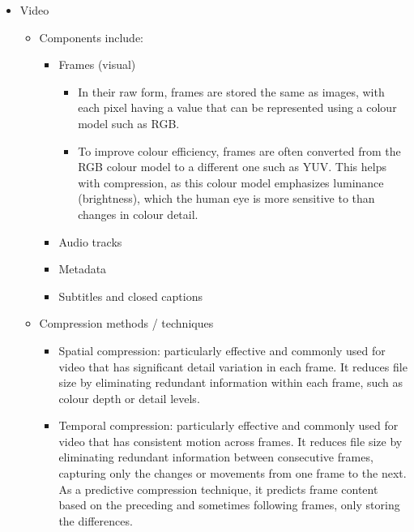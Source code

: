 \documentclass[a4paper,12pt]{article}
\begin{document}
\begin{itemize}
\begin{enumerate}
		\item Formula for calculating audio size:
		\[\text{file size (bits)}=\text{sampling rate}\times \text{bit depth}\times\text{\# of channels}\]
		\item Many formats to choose from for storing audio files: (They mainly differ by whether they are compressed or uncompressed)
		\begin{itemize}
		    \item Uncompressed formats store the raw binary data (e.g. WAV, AIFF)
		    \item Compressed formats use algorithms to reduce the file size for storage or transmission (e.g. MP3, FLAC)
		    \end{itemize}
        \end{enumerate}
    \item Video
    \begin{itemize}
        \item Components include:
        \begin{itemize}
            \item Frames (visual)
            \begin{itemize}
                \item In their raw form, frames are stored the same as images, with each pixel having a value that can be represented using a colour model such as RGB.
                \item To improve colour efficiency, frames are often converted from the RGB colour model to a different one such as YUV. This helps with compression, as this colour model emphasizes luminance (brightness), which the human eye is more sensitive to than changes in colour detail. 
                \end{itemize}
            \item Audio tracks
            \item Metadata
            \item Subtitles and closed captions
            \end{itemize}
			\item Compression methods / techniques
			\begin{itemize}
			    \item Spatial compression: particularly effective and commonly used for video that has significant detail variation in each frame. It reduces file size by eliminating redundant information within each frame, such as colour depth or detail levels.
			    \item Temporal compression: particularly effective and commonly used for video that has consistent motion across frames. It reduces file size by eliminating redundant information between consecutive frames, capturing only the changes or movements from one frame to the next. As a predictive compression technique, it predicts frame content based on the preceding and sometimes following frames, only storing the differences.
			    \end{itemize}
        \end{itemize}
\end{itemize}
\end{document}
